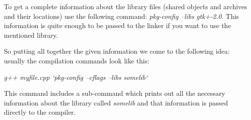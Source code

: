 To get a complete information about the library files (shared objects and archives and their locations) use the following command: \textit { pkg-config --libs gtk+-2.0}. This information is quite enough to be passed to the linker if you want to use the mentioned library.

So putting all together the given information we come to the following idea: usually the compilation commands look like this:

\textit { g++ myfile.cpp  `pkg-config --cflags --libs somelib` }

This command includes a sub-command which prints out all the necessary information about the library called \textit { somelib} and that information is passed directly to the compiler.
